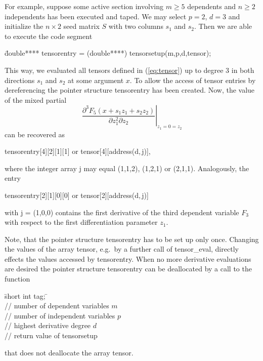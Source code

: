 \documentclass[11pt,twoside]{article}
\begin{document}
For example, suppose some active section involving  $m \geq 5$ dependents and 
$n \geq 2$ independents has been executed and taped. We may 
select $p=2$, $d=3$ and initialize the $n\times 2$ seed matrix $S$ with two 
columns $s_1$ and $s_2$. Then we are able to execute the code segment 
\begin{tabbing}
\hspace{0.5in}\={\sf double**** tensorentry = (double****) tensorsetup(m,p,d,tensor);} \\
\end{tabbing}
This way, we evaluated all tensors defined in (\ref{eq:tensor}) up to degree 3
in both directions $s_1$ and 
$s_2$ at some argument $x$. To allow the access of tensor entries by dereferencing the pointer 
structure {\sf tensorentry} has been created. Now,  
the value of the mixed partial
\[
 \left. \frac{\partial ^ 3 F_5(x+s_1 z_1+s_2 z_2)}{\partial z_1^2 \partial z_2}   \right |_{z_1=0=z_2}  
\]
can be recovered as 
\begin{center}
   {\sf tensorentry[4][2][1][1]} \hspace{0.2in} or \hspace{0.2in} {\sf tensor[4][address(d,$\,$j)]},
\end{center}
where the integer array {\sf j} may equal (1,1,2), (1,2,1) or (2,1,1).  
Analogously, the entry 
\begin{center}   
   {\sf tensorentry[2][1][0][0]} \hspace{0.2in} or \hspace{0.2in} {\sf tensor[2][address(d,$\,$j)]}
\end{center}
with {\sf j} = (1,0,0) contains the first derivative of the third dependent
variable $F_3$ with respect to the first differentiation parameter $z_1$. 

Note, that the pointer structure {\sf tensorentry} has to be set up only once. Changing the values of the
array {\sf tensor}, e.g.~by a further call of {\sf tensor\_eval}, directly effects the values accessed
by {\sf tensorentry}.
%
When no more derivative evaluations are desired the pointer structure
{\sf tensorentry} can be deallocated by a call to the function
%
\begin{tabbing}
\hspace{0.5in}\={\sf short int tag;} \hspace{1.1in}\= \kill    %
\\
                    \> // number of dependent variables $m$ \\
                    \> // number of independent variables $p$\\
                    \> // highest derivative degree $d$\\
 \> // return value of {\sf tensorsetup}  
\end{tabbing} 
%
that does not deallocate the array {\sf tensor}.
\end{document}
